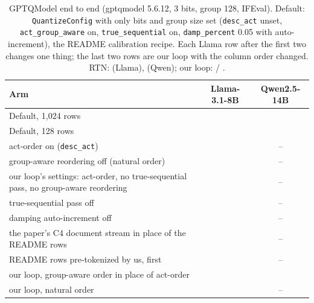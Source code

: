 \begin{table}[htbp]
\caption{GPTQModel end to end (gptqmodel 5.6.12, 3 bits, group 128, IFEval). Default: \texttt{QuantizeConfig} with only bits and group size set (\texttt{desc\_act} unset, \texttt{act\_group\_aware} on, \texttt{true\_sequential} on, \texttt{damp\_percent} 0.05 with auto-increment), the README calibration recipe. Each Llama row after the first two changes one thing; the last two rows are our loop with the column order changed. RTN: \LrtnIF{} (Llama), \QrtnIF{} (Qwen); our loop: \LgptqIF{} / \QgptqIF{}.}
\label{tab:library}
\begin{center}
\footnotesize
\begin{tabular}{lcc}
\toprule
Arm & Llama-3.1-8B & Qwen2.5-14B \\
\midrule
Default, 1,024 rows & \LibLoneKIF{} & \LibQoneKIF{} \\
Default, 128 rows & \LibLIF{} & \LibQIF{} \\
\midrule
act-order on (\texttt{desc\_act}) & \LibLdescIF{} & -- \\
group-aware reordering off (natural order) & \LibLnogarIF{} & -- \\
our loop's settings: act-order, no true-sequential pass, no group-aware reordering & \LibLourcfgIF{} & -- \\
true-sequential pass off & \LibLnotseqIF{} & -- \\
damping auto-increment off & \LibLfixdampIF{} & -- \\
the paper's C4 document stream in place of the README rows & \LibLpapercalIF{} & -- \\
README rows pre-tokenized by us, \bos{} first & \LibLpretokIF{} & -- \\
\midrule
our loop, group-aware order in place of act-order & \GarLIF{} & \GarQIF{} \\
our loop, natural order & \NoaoLIF{} & -- \\
\bottomrule
\end{tabular}
\end{center}
\end{table}


